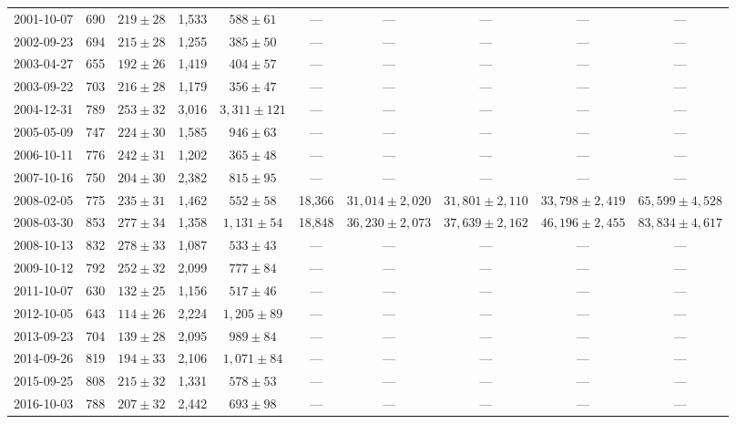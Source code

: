\begin{landscape}
\begin{longtable}{cccccccccc}
		{2001-10-07} & 690 & {$219  \pm  28$} & 1,533 & {$588 \pm 61$} & --- & --- & --- & --- & --- \\
		{2002-09-23} & 694 & {$215  \pm  28$} & 1,255 & {$385 \pm 50$} & --- & --- & --- & --- & --- \\
		{2003-04-27} & 655 & {$192  \pm  26$} & 1,419 & {$404 \pm 57$} & --- & --- & --- & --- & --- \\
		{2003-09-22} & 703 & {$216  \pm  28$} & 1,179 & {$356 \pm 47$} & --- & --- & --- & --- & --- \\
		{2004-12-31} & 789 & {$253  \pm  32$} & 3,016 & {$3,311 \pm 121$} & --- & --- & --- & --- & --- \\
		{2005-05-09} & 747 & {$224  \pm  30$} & 1,585 & {$946 \pm 63$} & --- & --- & --- & --- & --- \\
		{2006-10-11} & 776 & {$242  \pm  31$} & 1,202 & {$365 \pm 48$} & --- & --- & --- & --- & --- \\
		{2007-10-16} & 750 & {$204  \pm  30$} & 2,382 & {$815 \pm 95$} & --- & --- & --- & --- & --- \\
		{2008-02-05} & 775 & {$235  \pm  31$} & 1,462 & {$552 \pm 58$} & 18,366 & {$31,014 \pm 2,020$} & {$31,801 \pm 2,110$} & {$33,798 \pm 2,419$} & {$65,599 \pm 4,528$} \\
		{2008-03-30} & 853 & {$277  \pm  34$} & 1,358 & {$1,131 \pm 54$} & 18,848 & {$36,230 \pm 2,073$} & {$37,639 \pm 2,162$} & {$46,196 \pm 2,455$} & {$83,834 \pm 4,617$} \\
		{2008-10-13} & 832 & {$278  \pm  33$} & 1,087 & {$533 \pm 43$} & --- & --- & --- & --- & --- \\
		{2009-10-12} & 792 & {$252  \pm  32$} & 2,099 & {$777 \pm 84$} & --- & --- & --- & --- & --- \\
		{2011-10-07} & 630 & {$132  \pm  25$} & 1,156 & {$517 \pm 46$} & --- & --- & --- & --- & --- \\
		{2012-10-05} & 643 & {$114  \pm  26$} & 2,224 & {$1,205 \pm 89$} & --- & --- & --- & --- & --- \\
		{2013-09-23} & 704 & {$139  \pm  28$} & 2,095 & {$989 \pm 84$} & --- & --- & --- & --- & --- \\
		{2014-09-26} & 819 & {$194  \pm  33$} & 2,106 & {$1,071 \pm 84$} & --- & --- & --- & --- & --- \\
		{2015-09-25} & 808 & {$215  \pm  32$} & 1,331 & {$578 \pm 53$} & --- & --- & --- & --- & --- \\
		{2016-10-03} & 788 & {$207  \pm  32$} & 2,442 & {$693 \pm 98$} & --- & --- & --- & --- & --- \\
	\end{longtable} 
\end{landscape} 
